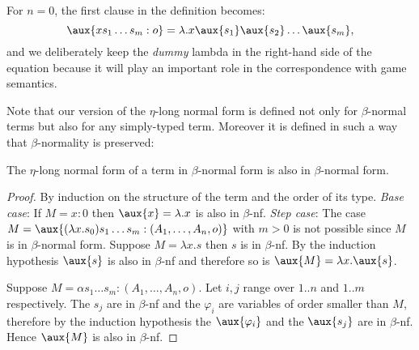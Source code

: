 For $n=0$, the first clause in the definition becomes:
$$\aux{x s_1 \ldots s_m : o} = \lambda . x \aux{s_1} \aux{s_2} \ldots \aux{s_m},$$
and we deliberately keep the \textsl{dummy} lambda in the right-hand
side of the equation because it will play an important role in the
correspondence with game semantics.



Note that our version of the $\eta$-long normal form is defined not only for $\beta$-normal terms but also for any simply-typed term.
Moreover it is defined in such a way that $\beta$-normality is preserved:
\begin{lem}
The $\eta$-long normal form of a term in $\beta$-normal form is also in $\beta$-normal form.
\end{lem}
\begin{proof}
By induction on the structure of the term and the order of its type.
\emph{Base case}:
If $M=x:0$ then $\aux{x} = \lambda . x$ is also in $\beta$-nf.
\emph{Step case}:
The case $M = \aux{(\lambda x . s_0) s_1 \ldots s_m : (A_1,\ldots,A_n,o)}$ with $m>0$ is not possible since $M$ is in
$\beta$-normal form.
Suppose $M = \lambda x . s$ then $s$ is in $\beta$-nf. By the induction hypothesis $\aux{s}$ is also in $\beta$-nf and therefore
so is $\aux{M} = \lambda x . \aux{s}$.

Suppose $M= \alpha s_1 \ldots s_m : (A_1,\ldots,A_n,o)$. Let $i,j$
range over $1..n$ and $1..m$ respectively. The $s_j$ are in
$\beta$-nf and the $\varphi_i$ are variables of order smaller than
$M$, therefore by the induction hypothesis the $\aux{\varphi_i}$ and
the $\aux{s_j}$ are in $\beta$-nf. Hence $\aux{M}$ is also in
$\beta$-nf.
\end{proof}


